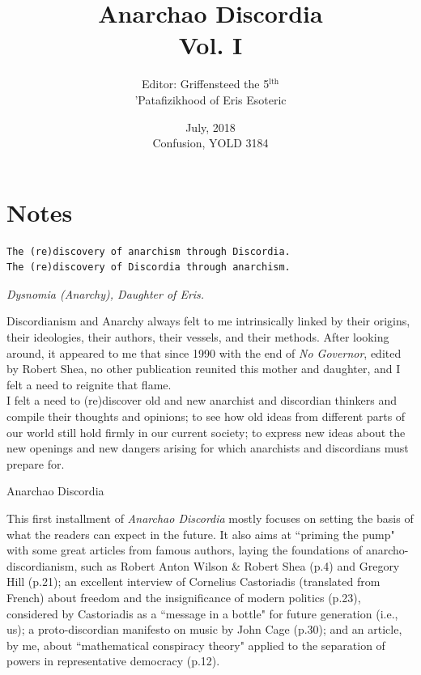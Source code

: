 \documentclass[12pt, onecolumn, letterpaper, oneside]{book}
\title{Anarchao Discordia\\
		\vspace{1\baselineskip}
		\large{Vol. I}
		}
\date{July, 2018\\
		 Confusion, YOLD 3184}
\author{Editor: Griffensteed the 5$^\text{lth}$\\
			'Patafizikhood of Eris Esoteric\\}
\begin{document}
\sloppy

\maketitle

\tableofcontents

\chapter*{Notes}
\begin{verbatim}
The (re)discovery of anarchism through Discordia.
The (re)discovery of Discordia through anarchism.           
\end{verbatim}

\begin{center}
\emph{Dysnomia (Anarchy), Daughter of Eris.}\\
\end{center}

Discordianism and Anarchy always felt to me intrinsically linked by their origins, their ideologies, their authors, their vessels, and their methods. After looking around, it appeared to me that since 1990 with the end of \emph{No Governor}, edited by Robert Shea, no other publication reunited this mother and daughter, and I felt a need to reignite that flame.\\
I felt a need to (re)discover old and new anarchist and discordian thinkers and compile their thoughts and opinions; to see how old ideas from different parts of our world still hold firmly in our current society; to express new ideas about the new openings and new dangers arising for which anarchists and discordians must prepare for.\\

\begin{center}
Anarchao Discordia\\
\end{center}

This first installment of \emph{Anarchao Discordia} mostly focuses on setting the basis of what the readers can expect in the future. It also aims at ``priming the pump" with some great articles from famous authors, laying the foundations of anarcho-discordianism, such as Robert Anton Wilson \& Robert Shea (p.4) and Gregory Hill (p.21); an excellent interview of Cornelius Castoriadis (translated from French) about freedom and the insignificance of modern politics (p.23), considered by Castoriadis as a ``message in a bottle" for future generation (i.e., us); a proto-discordian manifesto on music by John Cage (p.30); and an article, by me, about ``mathematical conspiracy theory" applied to the separation of powers in representative democracy (p.12).\\
\end{document}
